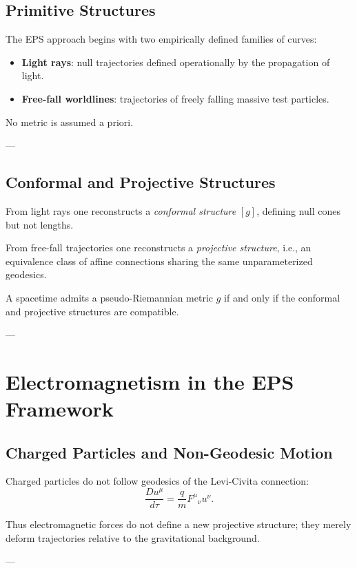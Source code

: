 \documentclass[11pt]{article}
\begin{document}
\subsection{Primitive Structures}

The EPS approach begins with two empirically defined families of curves:

\begin{itemize}
\item \textbf{Light rays}: null trajectories defined operationally by the propagation of light.
\item \textbf{Free-fall worldlines}: trajectories of freely falling massive test particles.
\end{itemize}

No metric is assumed a priori.

---

\subsection{Conformal and Projective Structures}

From light rays one reconstructs a \emph{conformal structure} $[g]$, defining null cones but not lengths.

From free-fall trajectories one reconstructs a \emph{projective structure}, i.e., an equivalence class of affine connections sharing the same unparameterized geodesics.

A spacetime admits a pseudo-Riemannian metric $g$ if and only if the conformal and projective structures are compatible.

---

\section{Electromagnetism in the EPS Framework}

\subsection{Charged Particles and Non-Geodesic Motion}

Charged particles do not follow geodesics of the Levi-Civita connection:
\[
\frac{D u^\mu}{d\tau} = \frac{q}{m} F^\mu{}_{\nu} u^\nu.
\]

Thus electromagnetic forces do not define a new projective structure; they merely deform trajectories relative to the gravitational background.

---
\end{document}
